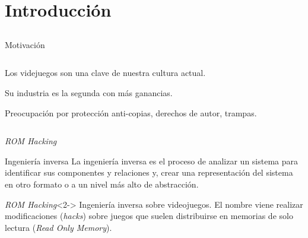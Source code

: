 
\section{Introducción}
\subsection{}

\begin{frame}{Motivación}
\begin{columns}
    \begin{column}{0.5\textwidth}
    \begin{wideitemize}
        \item<1-> Los videjuegos son una clave de nuestra cultura actual.

        \item<2-> Su industria es la segunda con más ganancias.

        \item<3-> Preocupación por protección anti-copias, derechos de autor, trampas.
    \end{wideitemize}
    \end{column}

    \begin{column}{0.5\textwidth}

    \end{column}
\end{columns}
\end{frame}

\begin{frame}{\textit{ROM Hacking}}
    \begin{block}{Ingeniería inversa}
        La ingeniería inversa es el proceso de analizar un sistema para identificar sus componentes y relaciones y, crear una representación del sistema en otro formato o a un nivel más alto de abstracción.
    \end{block}

    \begin{block}{\textit{ROM Hacking}}<2->
        Ingeniería inversa sobre videojuegos. El nombre viene realizar modificaciones (\textit{hacks}) sobre juegos que suelen distribuirse en memorias de solo lectura (\textit{Read Only Memory}).
    \end{block}
\end{frame}
